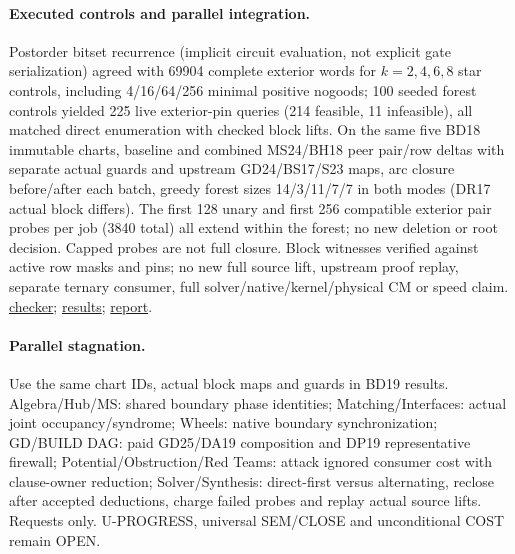 \documentclass[11pt]{article}
\begin{document}
\paragraph{Executed controls and parallel integration.}
Postorder bitset recurrence (implicit circuit evaluation, not explicit gate serialization) agreed with 69904 complete exterior words for $k=2,4,6,8$ star controls, including 4/16/64/256 minimal positive nogoods; 100 seeded forest controls yielded 225 live exterior-pin queries (214 feasible, 11 infeasible), all matched direct enumeration with checked block lifts. On the same five BD18 immutable charts, baseline and combined MS24/BH18 peer pair/row deltas with separate actual guards and upstream GD24/BS17/S23 maps, arc closure before/after each batch, greedy forest sizes 14/3/11/7/7 in both modes (DR17 actual block differs). The first 128 unary and first 256 compatible exterior pair probes per job (3840 total) all extend within the forest; no new deletion or root decision. Capped probes are not full closure. Block witnesses verified against active row masks and pins; no new full source lift, upstream proof replay, separate ternary consumer, full solver/native/kernel/physical CM or speed claim. \href{https://github.com/j15marti/pnp/commit/d162c31f6f290ed7f124957a2001da2bf9e459ef}{checker}; \href{https://github.com/j15marti/pnp/commit/a43ce14adbabd566a0ec3cc2fa9d0c45fcf44aa6}{results}; \href{https://github.com/j15marti/pnp/commit/5a1cd6d90ababb0ca46a498385a441c3bd9de768}{report}.
\paragraph{Parallel stagnation.}
Use the same chart IDs, actual block maps and guards in BD19 results. Algebra/Hub/MS: shared boundary phase identities; Matching/Interfaces: actual joint occupancy/syndrome; Wheels: native boundary synchronization; GD/BUILD DAG: paid GD25/DA19 composition and DP19 representative firewall; Potential/Obstruction/Red Teams: attack ignored consumer cost with clause-owner reduction; Solver/Synthesis: direct-first versus alternating, reclose after accepted deductions, charge failed probes and replay actual source lifts. Requests only. U-PROGRESS, universal SEM/CLOSE and unconditional COST remain OPEN.
\end{document}
